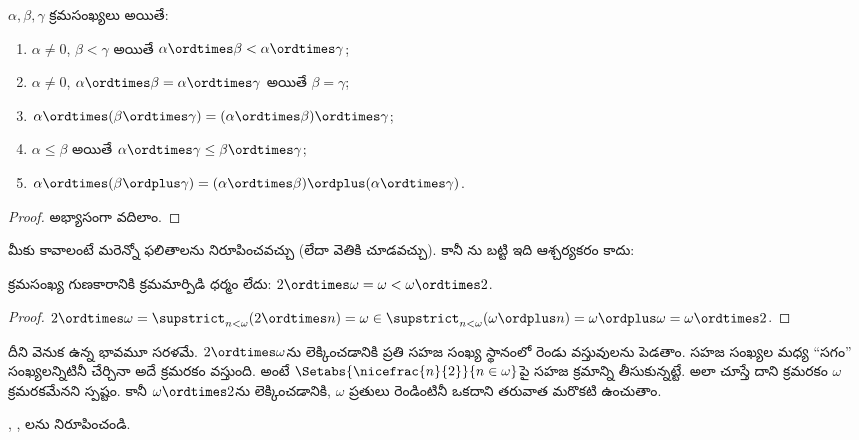 \documentclass[../../../include/open-logic-section]{subfiles}
\begin{document}
\begin{lem}
$\alpha, \beta, \gamma$ క్రమసంఖ్యలు అయితే:
\begin{enumerate}
	\item{} $\alpha \neq 0$, $\beta < \gamma$ అయితే $\alpha \ordtimes \beta < \alpha \ordtimes \gamma$;
	\item{} $\alpha \neq 0$, $\alpha \ordtimes
	\beta = \alpha\ordtimes\gamma$ అయితే $\beta = \gamma$;
	\item{} $\alpha \ordtimes (\beta \ordtimes
	\gamma) = (\alpha \ordtimes \beta) \ordtimes \gamma$;
	\item{} $\alpha \leq \beta$ అయితే $\alpha
	\ordtimes \gamma \leq \beta \ordtimes \gamma$;
	\item{} $\alpha \ordtimes (\beta \ordplus
	\gamma) = (\alpha \ordtimes \beta )\ordplus (\alpha\ordtimes
	\gamma)$.
\end{enumerate}
\end{lem}

\begin{proof}
అభ్యాసంగా వదిలాం.
\end{proof}

మీకు కావాలంటే మరెన్నో ఫలితాలను నిరూపించవచ్చు (లేదా వెతికి చూడవచ్చు). కానీ ను బట్టి ఇది ఆశ్చర్యకరం కాదు:

\begin{prop}
క్రమసంఖ్య గుణకారానికి క్రమమార్పిడి ధర్మం లేదు: $2 \ordtimes \omega  =
\omega < \omega \ordtimes 2$.
\end{prop}

\begin{proof}
$2 \ordtimes \omega = \supstrict_{n < \omega}(2\ordtimes  n) = \omega \in \supstrict_{n < \omega}(\omega \ordplus n) = \omega \ordplus \omega = \omega \ordtimes 2$.
\end{proof}
\noindent
దీని వెనుక ఉన్న భావమూ సరళమే. $2
\ordtimes \omega$ను లెక్కించడానికి ప్రతి సహజ సంఖ్య
స్థానంలో రెండు వస్తువులను పెడతాం. సహజ సంఖ్యల మధ్య
``సగం'' సంఖ్యలన్నిటినీ చేర్చినా అదే క్రమరకం వస్తుంది.
అంటే $\Setabs{\nicefrac{n}{2}}{n \in \omega}$పై సహజ
క్రమాన్ని తీసుకున్నట్టే. అలా చూస్తే దాని క్రమరకం
$\omega$ క్రమరకమేనని స్పష్టం. కానీ $\omega \ordtimes 2$ను
లెక్కించడానికి, $\omega$ ప్రతులు రెండింటినీ ఒకదాని తరువాత
మరొకటి ఉంచుతాం.

\begin{prob}
,
,
లను నిరూపించండి.
\end{prob}
\end{document}
